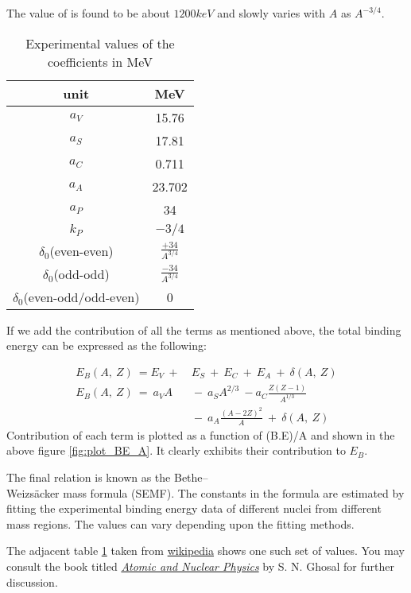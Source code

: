 \begin{enumerate}[label=\textbf{\Alph*.}]
         The value of  is found to be about $1200keV$ and slowly varies with $A$ as $A^{-3/4}$.
         
        \begin{table}
                \centering
                \begin{tabular}{|c|c|}
                \hline
                unit &  MeV\\
                \hline\hline
                $a_V$ & 15.76\\[0.5em]
                $a_S$ & 17.81\\[.5em]
                $a_C$ & 0.711\\[.5em]
                $a_A$ & 23.702\\[.5em]
                $a_P$ & 34\\[.5em]
                $k_P$ & ${-3/4}$\\[.5em]
                $\delta_0$(even-even) & $\frac{+34}{A^{3/4}}$\\[1em]
                $\delta_0$(odd-odd) & $\frac{-34}{A^{3/4}}$\\[1em]
                $\delta_0$(even-odd/odd-even) & 0\\[1em]\hline
                \end{tabular}
            \caption{Experimental values of the coefficients in MeV}
            \label{tab:table_num}
        \end{table}
    
    \pagebreak\par If we add the contribution of all the terms as mentioned above, the total binding energy can be expressed as the following:
    
        \begin{equation}
            \begin{split}
                E_B (A,~Z)~=E_V~+&~E_S~+~E_C~+~E_A~+~\delta(A,~Z)\\
                E_B(A,~Z)~=~a_VA&~-~a_SA^{2/3}~-a_C\frac{Z(Z-1)}{A^{1/3}}\\
                                &~-~a_A\frac{(A-2Z)^2}{A}~+~\delta(A,~Z) 
            \end{split}
        \end{equation}    
         Contribution of each term is plotted as a function of (B.E)/A and shown in the above figure \ref{fig:plot_BE_A}. It clearly exhibits their contribution to $E_B$.
        

        
     The final relation is known as the Bethe–\\Weizsäcker mass formula (SEMF). The constants in the formula are estimated by fitting the experimental binding energy data of different nuclei from different mass regions. The values can vary depending upon the fitting methods. 
    \par The adjacent table \ref{tab:table_num} taken from \href{https://cutt.ly/VRnd6zB}{wikipedia} shows one such set of values. You may  consult the book titled \href{https://books.google.co.in/books?id=fkqHNMd_248C&lpg=PP1&pg=PP1#v=onepage&q&f=false}{\textit{Atomic and  Nuclear Physics}} by S. N. Ghosal for further discussion.     
    

\end{enumerate}
